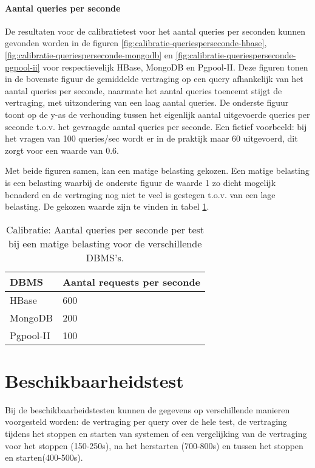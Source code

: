 \paragraph{Aantal queries per seconde}
De resultaten voor de calibratietest voor het aantal queries per seconden kunnen gevonden worden in de figuren \ref{fig:calibratie-queriesperseconde-hbase}, \ref{fig:calibratie-queriesperseconde-mongodb} en \ref{fig:calibratie-queriesperseconde-pgpool-ii} voor respectievelijk HBase, MongoDB en Pgpool-II. Deze figuren tonen in de bovenste figuur de gemiddelde vertraging op een query afhankelijk van het aantal queries per seconde, naarmate het aantal queries toeneemt stijgt de vertraging, met uitzondering van een laag aantal queries. De onderste figuur toont op de y-as de verhouding tussen het eigenlijk aantal uitgevoerde queries per seconde t.o.v. het gevraagde aantal queries per seconde. Een fictief voorbeeld: bij het vragen van 100 queries/sec wordt er in de praktijk maar 60 uitgevoerd, dit zorgt voor een waarde van $0.6$. 

Met beide figuren samen, kan een matige belasting gekozen. Een matige belasting is een belasting waarbij de onderste figuur de waarde 1 zo dicht mogelijk benaderd en de vertraging nog niet te veel is gestegen t.o.v. van een lage belasting. De gekozen waarde zijn te vinden in tabel \ref{table:calibratie-queriesperseconde-resultaat}. 

\begin{table}[htb!]
	\centering
	\begin{tabular}{l| l }
		\textbf{DBMS} & Aantal requests per seconde \\
		\hline
		HBase & 600 \\
		MongoDB & 200\\
		Pgpool-II & 100\\
	\end{tabular}
	\caption{Calibratie: Aantal queries per seconde per test bij een matige belasting voor de verschillende DBMS's.}
	\label{table:calibratie-queriesperseconde-resultaat}
\end{table}



\section{Beschikbaarheidstest}
Bij de beschikbaarheidstesten kunnen de gegevens op verschillende manieren voorgesteld worden: de vertraging per query over de hele test, de vertraging tijdens het stoppen en starten van systemen of een vergelijking van de vertraging voor het stoppen (150-250s), na het herstarten (700-800s) en tussen het stoppen en starten(400-500s). 

